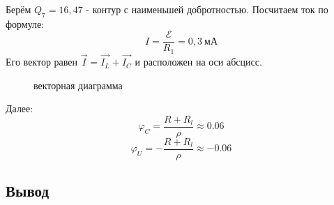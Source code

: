 \n\n
Берём $Q_7 = 16,47$ - контур с наименьшей добротностью. Посчитаем ток по формуле:
\begin{equation}
    I = \frac{\mathcal{E}}{R_1} = 0,3 \ \text{мА}
\end{equation}
Его вектор равен $\Vec{I}=\Vec{I_L} + \Vec{I_C}$ и расположен на оси абсцисс.
	\begin{figure}[H]
	\caption{\centering векторная диаграмма}
	\label{fig:image2}
\end{figure}
	\n
	Далее:
	\[\varphi_C = \frac{R + R_{l}}{\rho} \approx 0.06\]
	\[\varphi_U = - \frac{R + R_{l}}{\rho} \approx - 0.06\]
	\subsection*{Вывод}
